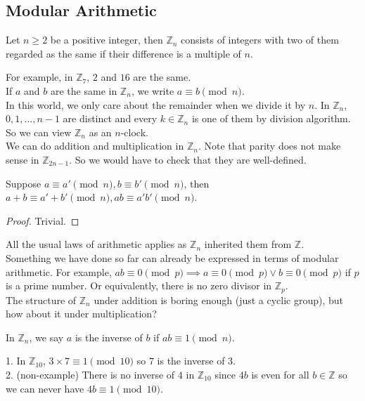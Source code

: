 \subsection{Modular Arithmetic}
\begin{definition}
    Let $n\ge 2$ be a positive integer, then $\mathbb Z_n$ consists of integers with two of them regarded as the same if their difference is a multiple of $n$.
\end{definition}
For example, in $\mathbb Z_7$, $2$ and $16$ are the same.\\
If $a$ and $b$ are the same in $\mathbb Z_n$, we write $a\equiv b\pmod{n}$.\\
In this world, we only care about the remainder when we divide it by $n$.
In $\mathbb Z_n$, $0,1,\ldots ,n-1$ are distinct and every $k\in\mathbb Z_n$ is one of them by division algorithm.
So we can view $\mathbb Z_n$ as an $n$-clock.\\
We can do addition and multiplication in $\mathbb Z_n$.
Note that parity does not make sense in $\mathbb Z_{2n-1}$.
So we would have to check that they are well-defined.
\begin{proposition}
    Suppose $a\equiv a'\pmod n,b\equiv b'\pmod n$, then $a+b\equiv a'+b'\pmod n, ab\equiv a'b'\pmod n$.
\end{proposition}
\begin{proof}
    Trivial.
\end{proof}
All the usual laws of arithmetic applies as $\mathbb Z_n$ inherited them from $\mathbb Z$.\\
Something we have done so far can already be expressed in terms of modular arithmetic.
For example, $ab\equiv 0\pmod{p}\implies a\equiv 0\pmod{p}\lor b\equiv 0\pmod{p}$ if $p$ is a prime number.
Or equivalently, there is no zero divisor in $\mathbb Z_p$.\\
The structure of $\mathbb Z_n$ under addition is boring enough (just a cyclic group), but how about it under multiplication?
\begin{definition}
    In $\mathbb Z_n$, we say $a$ is the inverse of $b$ if $ab\equiv 1\pmod{n}$.
\end{definition}
\begin{example}
    1. In $\mathbb Z_{10}$, $3\times 7\equiv 1\pmod{10}$ so $7$ is the inverse of $3$.\\
    2. (non-example) There is no inverse of $4$ in $\mathbb Z_{10}$ since $4b$ is even for all $b\in\mathbb Z$ so we can never have $4b\equiv 1\pmod{10}$.
\end{example}
